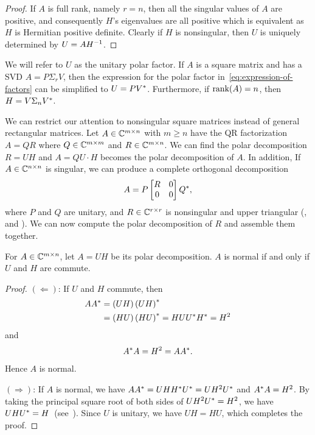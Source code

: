 \documentclass[12pt]{article}
\begin{document}
\begin{proof}
    If $A$ is full rank, namely $r = n$, then all the singular values of $A$ are positive, and consequently $H$'s eigenvalues are all positive which is equivalent as $H$ is Hermitian positive definite. Clearly if $H$ is nonsingular, then $U$ is uniquely determined by $U = AH^{-1}$.
\end{proof}
We will refer to $U$ as the unitary polar factor. If $A$ is a square matrix and 
has a SVD $A = P\Sigma_r V$, then the expression for the polar factor 
in~\eqref{eq:expression-of-factors} can be simplified to $U = PV^*$. 
Furthermore, if $\mathrm{rank}(A) = n$, then $H = V\Sigma_n V^*$.

We can restrict our attention to nonsingular square matrices instead of general rectangular matrices. Let $A\in\mathbb{C}^{m\times n}$ with $m\geq n$ have the QR factorization $A = QR$ where $Q\in\mathbb{C}^{m\times m}$ and $R\in \mathbb{C}^{m\times n}$. We can find the polar decomposition $R = UH$ and $A = QU \cdot H$ becomes the polar decomposition of $A$. In addition, If $A\in\mathbb{C}^{n\times n}$ is singular, we can produce a complete orthogonal decomposition
\begin{equation}
    A = P
    \begin{bmatrix}
        R & 0 \\ 0 & 0
    \end{bmatrix}
    Q^*,
\end{equation}
where $P$ and $Q$ are unitary, and $R\in\mathbb{C}^{r\times r}$ is nonsingular and upper triangular (,  and ). We can now compute the polar decomposition of $R$ and assemble them together.


\begin{theorem}
    For $A\in\mathbb{C}^{m\times n}$, let $A = UH$ be its polar decomposition. $A$ is normal if and only if $U$ and $H$ are commute.
\end{theorem}

\begin{proof}
    $(\Leftarrow)$: If $U$ and $H$ commute, then 
    \begin{equation}
        \notag
        \begin{aligned}
            AA^* &= \left(UH\right)\left(UH\right)^*\\
                & = \left(HU\right)\left(HU\right)^* = HUU^* H^* = H^2 \\
            \end{aligned}
    \end{equation}
    and 
    \begin{equation*}
        A^* A = H^2 = AA^*.
    \end{equation*}
    Hence $A$ is normal.

    $(\Rightarrow)$: If $A$ is normal, we have $AA^* = UHH^* U^*=UH^2U^*$ and $A^* A = H^2$. By taking the principal square root of both sides of $UH^2 U^* = H^2$, we have $UHU^* = H$~(see~). Since $U$ is unitary, we have $UH = HU$, which completes the proof.
\end{proof}
\end{document}
